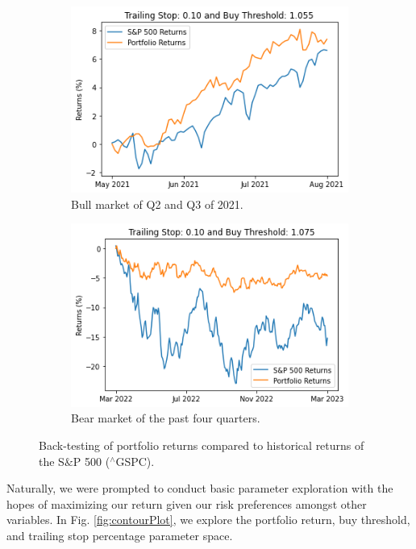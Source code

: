 \documentclass{article}
\begin{document}
\begin{figure}[H]
    \centering
    \begin{subfigure}{0.495\textwidth}
        \centering
        \includegraphics[width=\linewidth]{bullPlot.png}
        \caption{Bull market of Q2 and Q3 of 2021.}
        \label{fig:bullPlot}
    \end{subfigure}
    \hfill
    \begin{subfigure}{0.495\textwidth}
        \centering
        \includegraphics[width=\linewidth]{bearPlot.png}
        \caption{Bear market of the past four quarters.}
        \label{fig:bearPlot}
    \end{subfigure}
    \caption{Back-testing of portfolio returns compared to historical returns of the S$\&$P 500  ($^\wedge$GSPC).}
    \label{fig:portfolio}
\end{figure}
Naturally, we were prompted to conduct basic parameter exploration with the hopes of maximizing our return given our risk preferences amongst other variables. In Fig. \ref{fig:contourPlot}, we explore the portfolio return, buy threshold, and trailing stop percentage parameter space.
\end{document}
